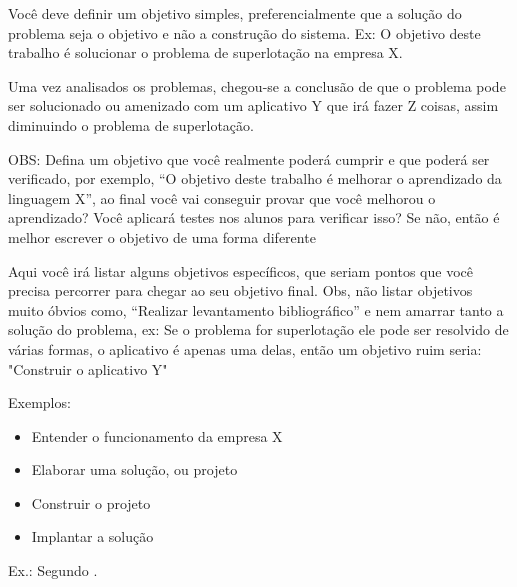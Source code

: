 

Você deve definir um objetivo simples, preferencialmente que a solução do problema seja o objetivo e não a construção do sistema.
Ex:
O objetivo deste trabalho é solucionar o problema de superlotação na empresa X.

Uma vez analisados os problemas, chegou-se a conclusão de que o problema pode ser solucionado ou amenizado com um aplicativo Y que irá fazer Z coisas, assim diminuindo o problema de superlotação.

OBS: Defina um objetivo que você realmente poderá cumprir e que poderá ser verificado, por exemplo, ``O objetivo deste trabalho é melhorar o aprendizado da linguagem X'', ao final você vai conseguir provar que você melhorou o aprendizado? Você aplicará testes nos alunos para verificar isso? Se não, então é melhor escrever o objetivo de uma forma diferente



Aqui você irá listar alguns objetivos específicos, que seriam pontos que você precisa percorrer para chegar ao seu objetivo final. Obs, não listar objetivos muito óbvios como, ``Realizar levantamento bibliográfico'' e nem amarrar tanto  a solução do problema, ex: Se o problema for superlotação ele pode ser resolvido de várias formas, o aplicativo é apenas uma delas, então um objetivo ruim seria: "Construir o aplicativo Y"

Exemplos:

\begin{itemize}
\item Entender o funcionamento da empresa X
\item Elaborar uma solução, ou projeto
\item Construir o projeto
\item Implantar a solução
\end{itemize}







\label{ref_teorico}


Ex.: Segundo .


